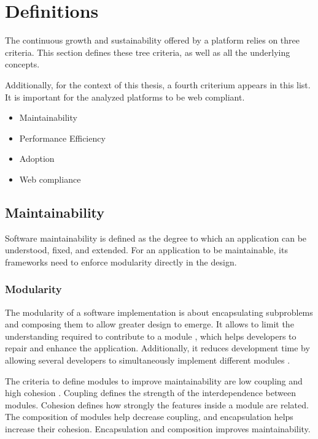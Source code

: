 \section{Definitions} \label{chapter3:definitions}

The continuous growth and sustainability offered by a platform relies on three criteria.
This section defines these tree criteria, as well as all the underlying concepts.

Additionally, for the context of this thesis, a fourth criterium appears in this list.
It is important for the analyzed platforms to be web compliant.

\begin{itemize}
\item Maintainability
\item Performance Efficiency
\item Adoption
\item Web compliance
\end{itemize}

\subsection{Maintainability}

Software maintainability is defined as the degree to which an application can be understood, fixed, and extended.
For an application to be maintainable, its frameworks need to enforce modularity directly in the design.

\subsubsection{Modularity}

The modularity of a software implementation is about encapsulating subproblems and composing them to allow greater design to emerge.
It allows to limit the understanding required to contribute to a module \cite{Stevens1974}, which helps developers to repair and enhance the application. 
Additionally, it reduces development time by allowing several developers to simultaneously implement different modules \cite{Wong2009,Cataldo2006}.

The criteria to define modules to improve maintainability are low coupling and high cohesion \cite{Stevens1974}.
Coupling defines the strength of the interdependence between modules.
Cohesion defines how strongly the features inside a module are related.
The composition of modules help decrease coupling, and encapsulation helps increase their cohesion.
Encapsulation and composition improves maintainability.

